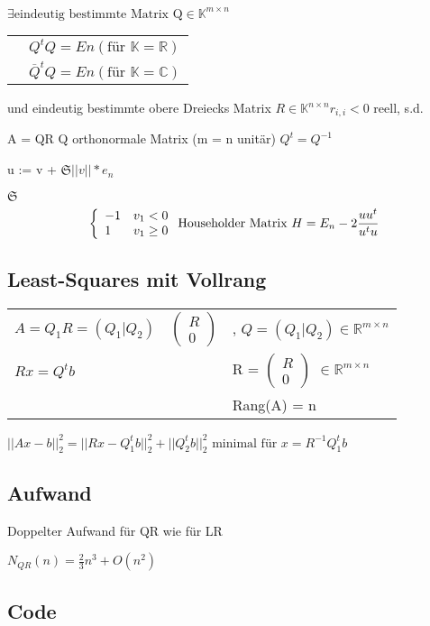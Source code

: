 \documentclass[12pt,a4paper]{article} %
\newcommand*\conj[1]{\overline{#1}}
\newcommand*\tab[1][1cm]{\hspace*{#1}}
\begin{document}
	$\exists \text{eindeutig bestimmte Matrix Q} \in \mathbb{K}^{m \times n}$
	\begin{tabular}{l l}
		& $Q^tQ = En (\text{für }\mathbb{K} = \mathbb{R})$  \\
		& $\conj{Q}^t Q = En (\text{für }\mathbb{K} = \mathbb{C})$
	\end{tabular}
	
	und eindeutig bestimmte obere Dreiecks Matrix $R \in \mathbb{K}^{n \times n} r_{i, i} < 0$ reell, s.d.
	
	A = QR \tab Q orthonormale Matrix (m = n unitär) $Q^t = Q^{-1}$
	
	u := v + $\mathfrak{S} ||v|| * e_n$
	
	$\mathfrak{S}$
	\[
		\left \{
			\begin{array}{l l}
				-1 & v_1 < 0 \\
				1 & v_1 \ge 0
			\end{array}
		\right. \text{Householder Matrix }H = E_n - 2 \frac{uu^t}{u^tu}
	\]
	
	\subsection{Least-Squares mit Vollrang}
	
	\begin{tabular}{l l l }
		$A = Q_1R = (Q_1|Q_2)$ &
		$\begin{pmatrix}
			R \\
			0
		\end{pmatrix}$ &
		, $Q = (Q_1|Q_2) \in \mathbb{R}^{m \times n}$ \\
		$Rx = Q^tb$ & & R = 
		$\begin{pmatrix}
			R \\
			0
		\end{pmatrix}$
		$\in \mathbb{R}^{m \times n}$ \\
		& & Rang(A) = n
	\end{tabular}
	
	$||Ax - b||_2^2 = ||Rx - Q_1^tb||_2^2 + ||Q_2^tb||_2^2 \text{ minimal für } x = R^{-1}Q_1^tb$
	
	\subsection{Aufwand}
	
	Doppelter Aufwand für QR wie für LR
	
	$N_{QR}(n) = \frac{2}{3}n^3 + O(n^2)$
	
	\subsection{Code}
	
\end{document}
